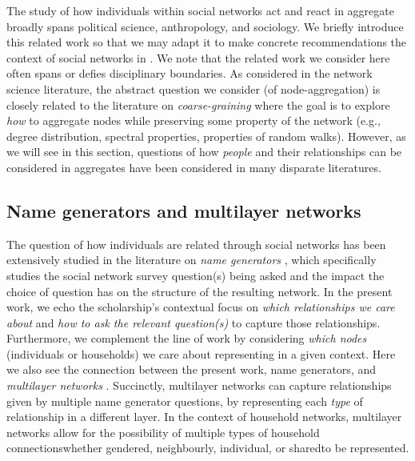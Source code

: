 The study of how individuals within social networks act and react in aggregate broadly spans political science, anthropology, and sociology. We briefly introduce this related work so that we may adapt it to make concrete recommendations the context of social networks in . We note that the related work we consider here often spans or defies disciplinary boundaries. As considered in the network science literature, the abstract question we consider (of node-aggregation) is closely related to the literature on \textit{coarse-graining} \citep{itzkovitz2005coarse, gfeller2007spectral, kim2004geographical, klein2020emergence} where the goal is to explore \textit{how} to aggregate nodes while preserving some property of the network (e.g., degree distribution, spectral properties, properties of random walks). However, as we will see in this section, questions of how \textit{people} and their relationships can be considered in aggregates have been considered in many disparate literatures.

\subsection*{Name generators and multilayer networks}\label{subsec:namegen}
The question of how individuals are related through social networks has been extensively studied in the literature on \textit{name generators} \citep{campbell1991name}, which specifically studies the social network survey question(s) being asked and the impact the choice of question has on the structure of the resulting network. In the present work, we echo the scholarship's contextual focus on \textit{which relationships we care about} and \textit{how to ask the relevant question(s)} to capture those relationships. Furthermore, we complement the line of work by considering \textit{which nodes} (individuals or households) we care about representing in a given context. Here we also see the connection between the present work, name generators, and \textit{multilayer networks} \citep[e.g.,][]{kivela2014multilayer}. Succinctly, multilayer networks can capture relationships given by multiple name generator questions, by representing each \textit{type} of relationship in a different layer. In the context of household networks, multilayer networks allow for the possibility of multiple types of household connections\textemdash whether gendered, neighbourly, individual, or shared\textemdash to be represented.

